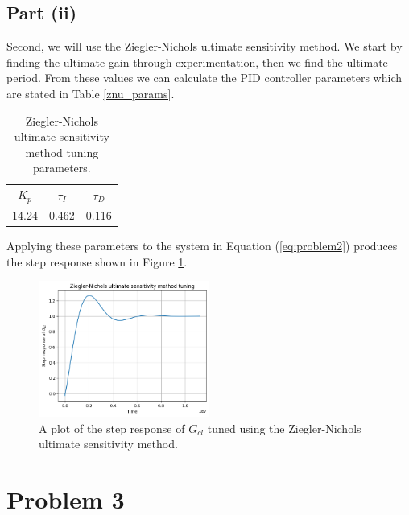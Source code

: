 \documentclass[10pt,a4paper]{article}
\begin{document}
    \subsection{Part (ii)}
        Second, we will use the Ziegler-Nichols ultimate sensitivity method. We start by finding the ultimate gain through experimentation, then we find the ultimate period. From these values we can calculate the PID controller parameters which are stated in Table \ref{znu_params}.
        \begin{table}[h]
            \centering
            \begin{tabular}{ c | c | c }
                $K_p$ & $\tau_I$ & $\tau_D$ \\
                14.24 & 0.462    & 0.116
            \end{tabular}
            \caption{Ziegler-Nichols ultimate sensitivity method tuning parameters.}
            \label{tb:znu_params}
        \end{table}
        Applying these parameters to the system in Equation (\ref{eq:problem2}) produces the step response shown in Figure \ref{fig:znu_gcl}.
        \begin{figure}[h]
            \centering
            \includegraphics[width=0.5\textwidth]{znu_Gcl.png}
            \caption{A plot of the step response of $G_{cl}$ tuned using the Ziegler-Nichols ultimate sensitivity method.}
            \label{fig:znu_gcl}
        \end{figure}
        
    \section{Problem 3}
        

    \printbibliography
\end{document}
